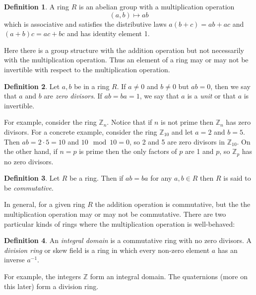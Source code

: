 \documentclass[11pt, oneside]{article}   	%
\theoremstyle{definition}
\newtheorem{definition}{Definition}[section]
\begin{document}
\noindent
\begin{definition}
A ring $R$ is an abelian group with a multiplication operation  
\begin{equation*}
(a, b) \mapsto ab
\end{equation*}
which is associative and satisfies the distributive laws $a(b+c) = ab+ac$ and $(a+b)c = ac+bc$ and has identity element 1.
\end{definition}

\noindent
Here there is a group structure with the addition operation but not necessarily with the multiplication operation. Thus an element of a ring may or may not 
be invertible with respect to the multiplication operation. 

\begin{definition}
Let $a,b$ be in a ring $R$. If $a \neq 0$ and $b \neq 0$ but $ab = 0$, then we say that $a$ and $b$ are 
\emph{zero divisors}. If $ab = ba = 1$, we say that $a$ is a \emph{unit} or that $a$ is invertible.
\end{definition}

\noindent
For example, consider the ring $\mathbb{Z}_n$. Notice that if $n$ is not prime then $\mathbb{Z}_n$ has zero divisors. For a concrete example, consider 
the ring  $\mathbb{Z}_{10}$ and let $a = 2$ and $b = 5$. Then  $ab = 2 \cdot 5 = 10$ and $10 \mod 10 = 0$, so 2 and 5 are zero divisors in 
$\mathbb{Z}_{10}$. On the other hand, if $n = p$ is prime then the only factors of $p$ are 1 and $p$, so $\mathbb{Z}_p$ has no zero divisors.

\begin{definition}
Let $R$ be a ring. Then if $ab = ba$ for any $a,b \in R$ then $R$ is said to be \emph{commutative}.
\end{definition}

\noindent
In general, for a given ring $R$ the addition operation is commutative,  but the the multiplication operation may or may not be commutative. 
There are two particular kinds of rings where the multiplication operation is well-behaved:

\begin{definition}
 An \emph{integral domain} is a commutative ring with no zero divisors. A \emph{division ring} or skew field is a ring in which every non-zero element $a$
 has an inverse $a^{-1}$.
\end{definition}

\noindent
For example, the integers $\mathbb{Z}$ form an integral domain. The quaternions (more on this later) form a division ring.
\end{document}
